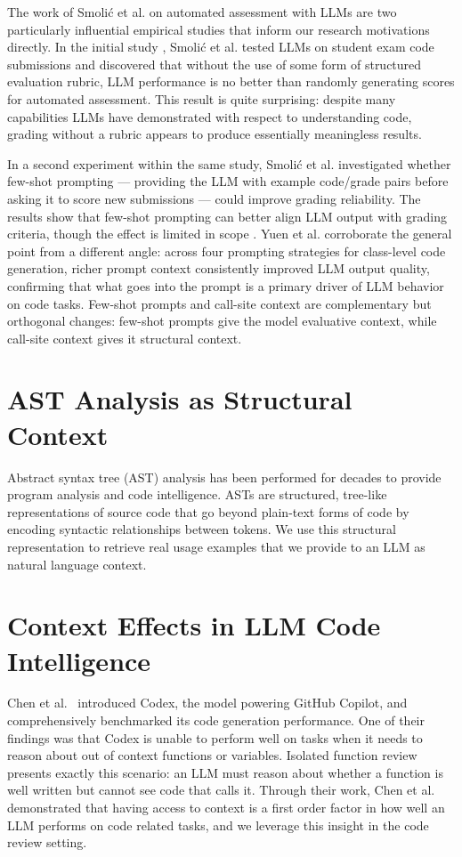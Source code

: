 \documentclass[12pt]{report}
\begin{document}
The work of Smoli\'{c} et al. on automated assessment with LLMs are two particularly influential empirical studies that inform our research motivations directly. In the initial study \cite{Smolic2024MIPRO}, Smoli\'{c} et al. tested LLMs on student exam code submissions and discovered that without the use of some form of structured evaluation rubric, LLM performance is no better than randomly generating scores for automated assessment. This result is quite surprising: despite many capabilities LLMs have demonstrated with respect to understanding code, grading without a rubric appears to produce essentially meaningless results. 

In a second experiment within the same study, Smoli\'{c} et al. investigated whether few-shot prompting --- providing the LLM with example code/grade pairs before asking it to score new submissions --- could improve grading reliability. The results show that few-shot prompting can better align LLM output with grading criteria, though the effect is limited in scope \cite{Smolic2024MIPRO}. Yuen et al. \cite{yuen2024prompting} corroborate the general point from a different angle: across four prompting strategies for class-level code generation, richer prompt context consistently improved LLM output quality, confirming that what goes into the prompt is a primary driver of LLM behavior on code tasks. Few-shot prompts and call-site context are complementary but orthogonal changes: few-shot prompts give the model evaluative context, while call-site context gives it structural context.

\section{AST Analysis as Structural Context}

Abstract syntax tree (AST) analysis has been performed for decades to provide program analysis and code intelligence. ASTs are structured, tree-like representations of source code that go beyond plain-text forms of code by encoding syntactic relationships between tokens. We use this structural representation to retrieve real usage examples that we provide to an LLM as natural language context.


\section{Context Effects in LLM Code Intelligence}

Chen et al.~\cite{chen2021codex} introduced Codex, the model powering GitHub Copilot, and comprehensively benchmarked its code generation performance. One of their findings was that Codex is unable to perform well on tasks when it needs to reason about out of context functions or variables. Isolated function review presents exactly this scenario: an LLM must reason about whether a function is well written but cannot see code that calls it. Through their work, Chen et al. demonstrated that having access to context is a first order factor in how well an LLM performs on code related tasks, and we leverage this insight in the code review setting.
\end{document}

